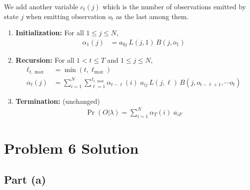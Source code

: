 \documentclass[11pt,a4paper,titlepage]{article}
\begin{document}
We add another variable $c_t(j)$ which is the number of observations emitted by
state $j$ when emitting observation $o_t$ as the last among them.
\begin{enumerate}
    \item \textbf{Initialization:} For all $1 \le j \le N$,
        \begin{align*}
            \alpha_1(j) &= a_{0j} \, L(j, 1) \, B(j, o_1)
        \end{align*}
    \item \textbf{Recursion:} For all $1 < t \le T$ and $1 \le j \le N$,
        \begin{align*}
            \ell_{t, \max} &= \min(t, \ell_{\max}) \\
            \alpha_t(j) &= \sum_{i=1}^N \sum_{\ell=1}^{\ell_{t, \max}} \alpha_{t-\ell}(i) \;
                          a_{ij} \, L(j, \ell) \, B(j, o_{t-\ell+1}, \cdots o_t)
        \end{align*}
    \item \textbf{Termination:} (unchanged)
        \begin{align*}
            \Pr(O|\lambda) = \sum_{i=1}^N \alpha_T(i) \; a_{iF}
        \end{align*}
\end{enumerate}

\section*{Problem 6 Solution}
\subsection*{Part (a)}
\end{document}
